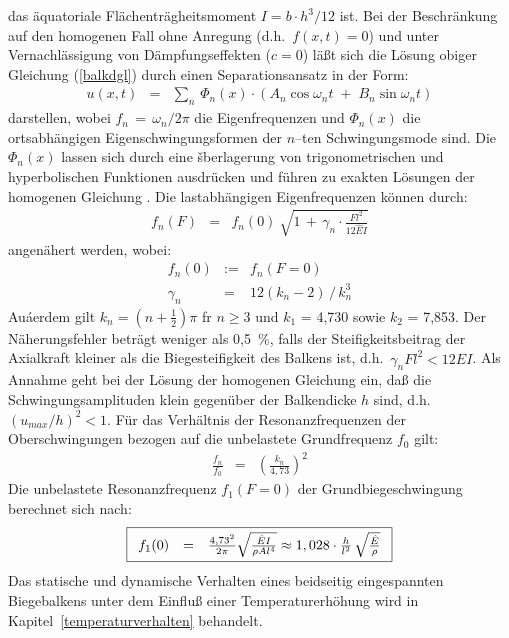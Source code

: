 das äquatoriale Flächenträgheitsmoment $I = b \cdot h^{3} / 12$ ist.
Bei der Beschränkung auf den homogenen Fall ohne Anregung
(d.h.\ $f(x,t) = 0$) und unter Vernachlässigung von Dämpfungseffekten
($c = 0$) läßt sich die Lösung obiger Gleichung (\ref{balkdgl}) durch einen
Separationsansatz in der Form:
%
\begin{eqnarray}
  u(x,t) & = & \sum_{n} \, \Phi_{n}(x) \cdot \left
  ( A_{n} \cos \omega_{n}t \; + \; B_{n} \sin \omega _{n} t \right )
\end{eqnarray}
%
darstellen, wobei $f_{n} \, = \, \omega_{n}/{2\pi}$ die Eigenfrequenzen
und $\Phi_{n}(x)$ die ortsabhängigen Eigenschwingungsformen der $n$--ten
Schwingungsmode sind. Die $\Phi_{n}(x)$ lassen sich durch eine
šberlagerung von trigonometrischen und hyperbolischen Funktionen
ausdrücken und führen zu exakten Lösungen der homogenen Gleichung
\cite{Bou91}. Die lastabhängigen Eigenfrequenzen können durch:
%
\begin{eqnarray}
\label{freqF}
f_{n}(F) & = & f_{n}(0) \: \sqrt{ 1 \, + \, \gamma_{n} \cdot
               \frac{Fl^{2}}{12 \hat E I}}
\end{eqnarray}
%
angenähert werden, wobei:
\begin{eqnarray*}
        f_{n}(0)   & := & f_{n}(F=0) \nonumber \\
        \gamma_{n} & = & 12(k_{n} - 2) \, / \, k_{n}^{3}
\end{eqnarray*}
Auáerdem gilt $k_{n} = (n + \frac{1}{2}) \pi$ fr $n \geq 3$ und
$k_{1}$ = 4,730 sowie $k_{2}$ = 7,853.
Der Näherungsfehler beträgt weniger als 0,5~\%, falls der Steifigkeitsbeitrag
der Axialkraft kleiner als die Biegesteifigkeit des Balkens ist, d.h.\
$\gamma_{n} Fl^{2} < 12 \hat E I$. Als Annahme geht bei der Lösung
der homogenen Gleichung            %
ein, daß die Schwingungsamplituden klein
gegenüber der Balkendicke $h$ sind, d.h.\ $(u_{max}/h)^2 < 1$. Für das
Verhältnis der Resonanzfrequenzen der Oberschwingungen bezogen auf die
unbelastete Grundfrequenz $f_{0}$ gilt:
%
\begin{eqnarray}
        \frac {f_{n}}{f_{0}} & = & \left( \frac{k_{n}}{4,73} \right)^2
\end{eqnarray}
%
Die unbelastete Resonanzfrequenz $f_{1}(F = 0)$ der Grundbiegeschwingung
berechnet sich nach:
%
\begin{equation}
\label{balkfreq}
\fbox{$
 \displaystyle
 \begin{array}{rcl}
    f_{1}(0) & = & \frac{ {4,73}^{2} }{2 \pi}
        \sqrt{ \frac{ \hat E I}{\rho A l^{4}}}
        \approx 1,028 \cdot \frac {h}{l^{2}} \, \sqrt{ \frac{\hat E}{\rho}}
 \end{array}
 $}
\end{equation}
%
Das statische und dynamische Verhalten eines beidseitig eingespannten
Biegebalkens unter dem Einfluß einer Temperaturerhöhung wird in
Kapitel~\ref{temperaturverhalten} behandelt.



